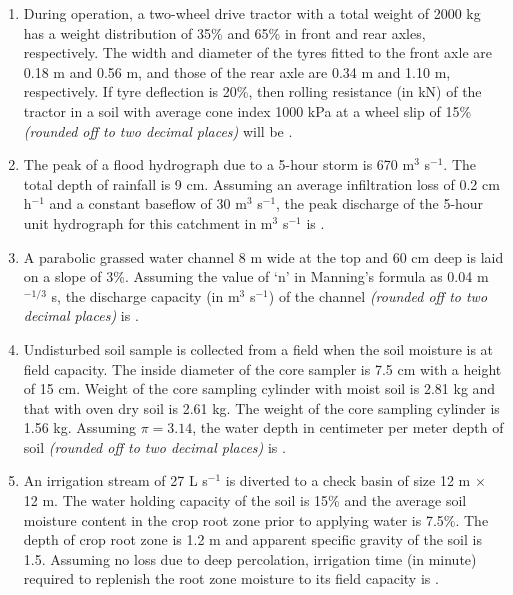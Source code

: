 \documentclass[12pt]{article}
\begin{document}
\begin{enumerate}[label =Q.\arabic*,start=26]
		\item During operation, a two-wheel drive tractor with a total weight of 2000 kg has a weight distribution of 35\% and 65\% in front and rear axles, respectively. The width and diameter of the tyres fitted to the front axle are 0.18 m and 0.56 m, and those of the rear axle are 0.34 m and 1.10 m, respectively. If tyre deflection is 20\%, then rolling resistance (in kN) of the tractor in a soil with average cone index 1000 kPa at a wheel slip of 15\% \textit{(rounded off to two decimal places)} will be \underline{\hspace{2cm}}.

		\item The peak of a flood hydrograph due to a 5-hour storm is 670 m$^3$ s$^{-1}$. The total depth of rainfall is 9 cm. Assuming an average infiltration loss of 0.2 cm h$^{-1}$ and a constant baseflow of 30 m$^3$ s$^{-1}$, the peak discharge of the 5-hour unit hydrograph for this catchment in m$^3$ s$^{-1}$ is \underline{\hspace{2cm}}.

		\item A parabolic grassed water channel 8 m wide at the top and 60 cm deep is laid on a slope of 3\%. Assuming the value of ‘n’ in Manning’s formula as 0.04 m$^{-1/3}$ s, the discharge capacity (in m$^3$ s$^{-1}$) of the channel \textit{(rounded off to two decimal places)} is \underline{\hspace{2cm}}.
			\newpage

		\item Undisturbed soil sample is collected from a field when the soil moisture is at field capacity. The inside diameter of the core sampler is 7.5 cm with a height of 15 cm. Weight of the core sampling cylinder with moist soil is 2.81 kg and that with oven dry soil is 2.61 kg. The weight of the core sampling cylinder is 1.56 kg. Assuming $\pi = 3.14$, the water depth in centimeter per meter depth of soil \textit{(rounded off to two decimal places)} is \underline{\hspace{2cm}}.

		\item An irrigation stream of 27 L s$^{-1}$ is diverted to a check basin of size 12 m $\times$ 12 m. The water holding capacity of the soil is 15\% and the average soil moisture content in the crop root zone prior to applying water is 7.5\%. The depth of crop root zone is 1.2 m and apparent specific gravity of the soil is 1.5. Assuming no loss due to deep percolation, irrigation time (in minute) required to replenish the root zone moisture to its field capacity is \underline{\hspace{2cm}}.


\end{enumerate}
\end{document}
